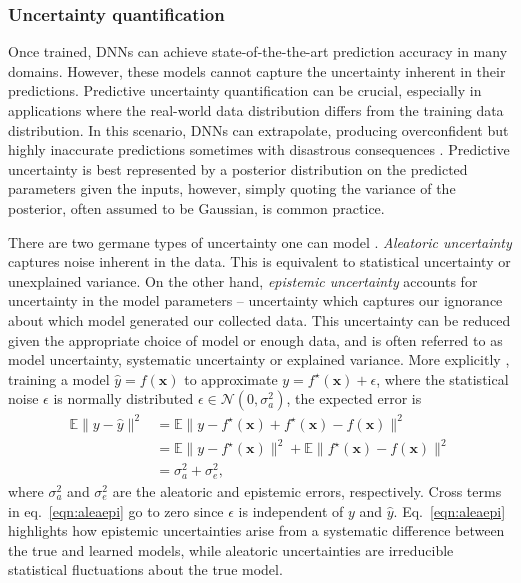 \subsubsection{Uncertainty quantification}
Once trained, DNNs can achieve state-of-the-the-art prediction accuracy in many domains. However, these models cannot capture the uncertainty inherent in their predictions. Predictive uncertainty quantification can be crucial, especially in applications where the real-world data distribution differs from the training data distribution. In this scenario, DNNs can extrapolate, producing overconfident but highly inaccurate predictions sometimes with disastrous consequences \citep{amodei_concrete_2016}.
Predictive uncertainty is best represented by a posterior distribution on the predicted parameters given the inputs, however, simply quoting the variance of the posterior, often assumed to be Gaussian, is common practice.

There are two germane types of uncertainty one can model \citep{kendall_what_2017}. \textit{Aleatoric uncertainty} captures noise inherent in the data. This is equivalent to statistical uncertainty or unexplained variance. On the other hand, \textit{epistemic uncertainty} accounts for uncertainty in the model parameters – uncertainty which captures our ignorance about which model generated our collected data. This uncertainty can be reduced given the appropriate choice of model or enough data, and is often referred to as model uncertainty, systematic uncertainty or explained variance. More explicitly \citep{choi_uncertainty-aware_2017}, training a model $\hat{y} = f(\mathbf{x})$ to approximate $y = f^{\star}(\mathbf{x}) + \epsilon$, where the statistical noise $\epsilon$ is normally distributed $\epsilon \in \mathcal{N}(0,\sigma^2_a)$, the expected error is
\begin{equation}
\begin{aligned}
    \mathbb{E}\|y - \hat{y}\|^2 &= \mathbb{E}\|y - f^{\star}(\mathbf{x}) + f^{\star}(\mathbf{x}) - f(\mathbf{x})\|^2 \\
    &=  \mathbb{E}\|y - f^{\star}(\mathbf{x})\|^2 + \mathbb{E}\|f^{\star}(\mathbf{x}) - f(\mathbf{x})\|^2 \\
    &= \sigma_a^2 + \sigma_e^2,
    \label{eqn:aleaepi}
\end{aligned}
\end{equation}
where $\sigma_a^2$ and $\sigma_e^2$ are the aleatoric and epistemic errors, respectively. Cross terms in eq.~\ref{eqn:aleaepi} go to zero since $\epsilon$ is independent of $y$ and $\hat{y}$. Eq.~\ref{eqn:aleaepi} highlights how epistemic uncertainties arise from a systematic difference between the true and learned models, while aleatoric uncertainties are irreducible statistical fluctuations about the true model.


